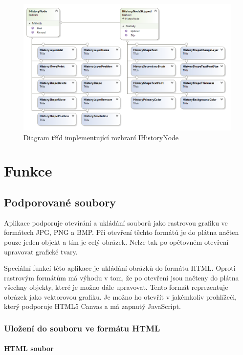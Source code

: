 \documentclass[
  field=inf,
  biblatex,
  glossaries,
  index
]{kidiplom}
\begin{document}
\begin{figure}
\includegraphics[width=15cm]{img/history_diag}
\caption{Diagram tříd implementující rozhraní IHistoryNode}
\end{figure}  

\section{Funkce}

\subsection{Podporované soubory}

Aplikace podporuje otevírání a ukládání souborů jako rastrovou grafiku ve formátech JPG, PNG a BMP. Při otevření těchto formátů je do plátna načten pouze jeden objekt a tím je celý obrázek. Nelze tak po opětovném otevření upravovat grafické tvary. 

Speciální funkcí této aplikace je ukládání obrázků do formátu HTML. Oproti rastrovým formátům má výhodu v tom, že po otevření jsou načteny do plátna všechny objekty, které je možno dále upravovat. Tento formát reprezentuje obrázek jako vektorovou grafiku. Je možno ho otevřít v jakémkoliv prohlížeči, který podporuje HTML5 Canvas a má zapnutý JavaScript.

\subsubsection{Uložení do souboru ve formátu HTML}

\paragraph{HTML soubor}
\end{document}
